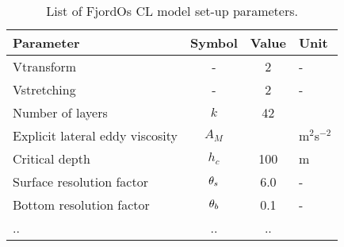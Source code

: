 \begin{table}[t]
 \begin{center}
  \caption{List of FjordOs CL model set-up parameters.}
   \begin{tabular}{lccl}
   \hline
    Parameter				& Symbol	& Value	& Unit		\\
   \hline
    Vtransform				& -		& 2 	& -		\\
    Vstretching 			& -		& 2	& -		\\
    Number of layers			& $k$ 		& 42 \\
    Explicit lateral eddy viscosity	& $A_M$		& 	& m$^2$s$^{-2}$	\\
    Critical depth			& $h_c$		& 100	& m		\\
    Surface resolution factor		& $\theta_s$	& 6.0	& -		\\
    Bottom resolution factor		& $\theta_b$	& 0.1	& -		\\
    .. 					& ..		& ..	&		\\
   \hline
   \end{tabular}
  \label{tab:parameters}
 \end{center}
\end{table} 

